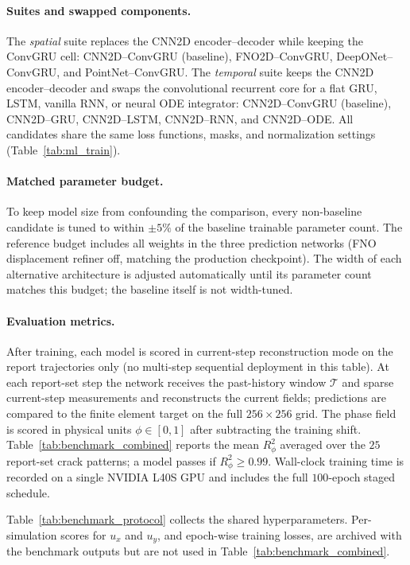 \documentclass[10pt]{article}
\theoremstyle{definition}
\begin{document}
\paragraph{Suites and swapped components.}
The \emph{spatial} suite replaces the CNN2D encoder--decoder while keeping the ConvGRU cell: CNN2D--ConvGRU (baseline), FNO2D--ConvGRU, DeepONet--ConvGRU, and PointNet--ConvGRU.
%
The \emph{temporal} suite keeps the CNN2D encoder--decoder and swaps the convolutional recurrent core for a flat GRU, LSTM, vanilla RNN, or neural ODE integrator: CNN2D--ConvGRU (baseline), CNN2D--GRU, CNN2D--LSTM, CNN2D--RNN, and CNN2D--ODE.
%
All candidates share the same loss functions, masks, and normalization settings (Table~\ref{tab:ml_train}).

\paragraph{Matched parameter budget.}
To keep model size from confounding the comparison, every non-baseline candidate is tuned to within $\pm5\%$ of the baseline trainable parameter count.
%
The reference budget includes all weights in the three prediction networks (FNO displacement refiner off, matching the production checkpoint).
%
The width of each alternative architecture is adjusted automatically until its parameter count matches this budget; the baseline itself is not width-tuned.

\paragraph{Evaluation metrics.}
After training, each model is scored in current-step reconstruction mode on the report trajectories only (no multi-step sequential deployment in this table).
%
At each report-set step the network receives the past-history window $\mathcal{T}$ and sparse current-step measurements and reconstructs the current fields; predictions are compared to the finite element target on the full $256\times256$ grid.
%
The phase field is scored in physical units $\phi\in[0,1]$ after subtracting the training shift.
%
Table~\ref{tab:benchmark_combined} reports the mean $R^2_{\phi}$ averaged over the $25$ report-set crack patterns; a model passes if $R^2_{\phi}\ge0.99$.
%
Wall-clock training time is recorded on a single NVIDIA L40S GPU and includes the full $100$-epoch staged schedule.

Table~\ref{tab:benchmark_protocol} collects the shared hyperparameters.
%
Per-simulation scores for $u_x$ and $u_y$, and epoch-wise training losses, are archived with the benchmark outputs but are not used in Table~\ref{tab:benchmark_combined}.
\end{document}
